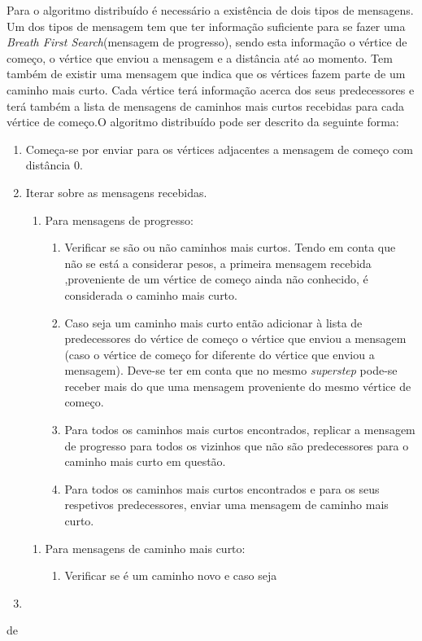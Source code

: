 Para o algoritmo distribuído é necessário a existência de dois tipos de 
mensagens. Um dos tipos de mensagem tem que ter informação suficiente para se 
fazer uma \textit{Breath First Search}(mensagem de progresso), sendo esta 
informação o vértice de começo, o vértice que enviou a mensagem e a distância 
até ao momento. Tem também de existir 
uma mensagem que indica que os vértices fazem parte de um caminho mais curto. 
Cada vértice terá informação acerca dos seus predecessores e terá também a 
lista de mensagens de caminhos mais curtos recebidas para cada vértice de 
começo.O algoritmo distribuído pode ser descrito da seguinte forma:
\begin{algorithm}
    \begin{minipage}{\linewidth}  \begin{enumerate}
      \item Começa-se por enviar para os vértices adjacentes a 
mensagem de começo com distância 0.
      \item Iterar sobre as mensagens recebidas.
      \begin{enumerate}
	\item Para mensagens de progresso:
	\begin{enumerate}
	  \item Verificar se são ou não caminhos mais curtos. Tendo em 
conta que não se está a considerar pesos, a primeira mensagem recebida 
,proveniente de um vértice de começo ainda não conhecido, é considerada o 
caminho mais curto.
	  \item Caso seja um caminho mais curto então adicionar à lista de 
predecessores do vértice de começo o vértice que enviou a mensagem (caso o 
vértice de começo for diferente do vértice que enviou a mensagem). Deve-se ter 
em conta que no mesmo \textit{superstep} pode-se receber mais do que uma 
mensagem proveniente do mesmo vértice de começo.
	  \item Para todos os caminhos mais curtos encontrados, replicar a 
mensagem de progresso para todos os vizinhos que não são predecessores para o 
caminho mais curto em questão.
	  \item Para todos os caminhos mais curtos encontrados e para os seus 
respetivos predecessores, enviar uma mensagem de caminho mais curto.
	\end{enumerate}
      \end{enumerate}
      \begin{enumerate}
	\item Para mensagens de caminho mais curto:
	\begin{enumerate}
	  \item Verificar se é um caminho novo e caso seja
	\end{enumerate}
      \end{enumerate}
      \item 
    \end{enumerate}
  \end{minipage}
\end{algorithm} de

